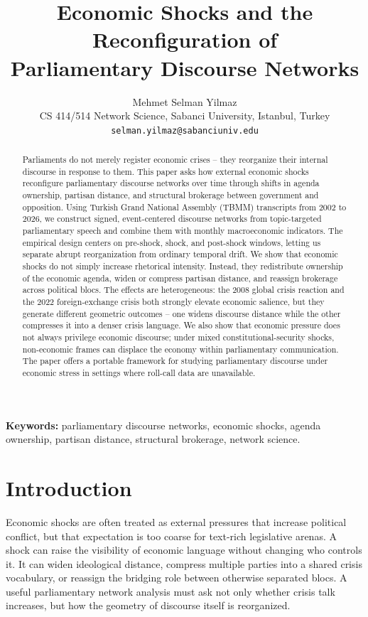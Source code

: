 \documentclass[11pt]{article}
\title{\vspace{-2.2em}\bfseries Economic Shocks and the Reconfiguration of\\[2pt]
Parliamentary Discourse Networks}
\author{Mehmet Selman Yilmaz\\[3pt]
{\normalsize CS 414/514 Network Science, Sabanci University, Istanbul, Turkey}\\
{\normalsize\texttt{selman.yilmaz@sabanciuniv.edu}}}
\date{}
\begin{document}
\maketitle

\begin{abstract}
\noindent Parliaments do not merely register economic crises -- they reorganize their internal discourse in response to them. This paper asks how external economic shocks reconfigure parliamentary discourse networks over time through shifts in agenda ownership, partisan distance, and structural brokerage between government and opposition. Using Turkish Grand National Assembly (TBMM) transcripts from 2002 to 2026, we construct signed, event-centered discourse networks from topic-targeted parliamentary speech and combine them with monthly macroeconomic indicators. The empirical design centers on pre-shock, shock, and post-shock windows, letting us separate abrupt reorganization from ordinary temporal drift. We show that economic shocks do not simply increase rhetorical intensity. Instead, they redistribute ownership of the economic agenda, widen or compress partisan distance, and reassign brokerage across political blocs. The effects are heterogeneous: the 2008 global crisis reaction and the 2022 foreign-exchange crisis both strongly elevate economic salience, but they generate different geometric outcomes -- one widens discourse distance while the other compresses it into a denser crisis language. We also show that economic pressure does not always privilege economic discourse; under mixed constitutional-security shocks, non-economic frames can displace the economy within parliamentary communication. The paper offers a portable framework for studying parliamentary discourse under economic stress in settings where roll-call data are unavailable.
\end{abstract}

\noindent\textbf{Keywords:} parliamentary discourse networks, economic shocks, agenda ownership, partisan distance, structural brokerage, network science.

\section{Introduction}
Economic shocks are often treated as external pressures that increase political conflict, but that expectation is too coarse for text-rich legislative arenas. A shock can raise the visibility of economic language without changing who controls it. It can widen ideological distance, compress multiple parties into a shared crisis vocabulary, or reassign the bridging role between otherwise separated blocs. A useful parliamentary network analysis must ask not only whether crisis talk increases, but how the geometry of discourse itself is reorganized.
\end{document}
